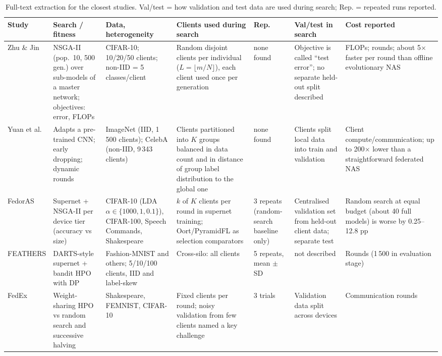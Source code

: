 \documentclass[11pt,a4paper]{article}
\begin{document}
\begin{landscape}
\begin{table}[p]\centering\scriptsize
\caption{Full-text extraction for the closest studies. Val/test = how validation and test data are used during search; Rep. = repeated runs reported.}\label{tab:fulltext}
\begin{tabular}{@{}p{2.5cm}p{4cm}p{3.6cm}p{4.4cm}p{1.9cm}p{3.1cm}p{3.1cm}@{}}\toprule
Study & Search / fitness & Data, heterogeneity & Clients used during search & Rep. & Val/test in search & Cost reported\\\midrule
Zhu \& Jin \cite{zhu2021realtime} & NSGA-II (pop.\ 10, 500 gen.) over sub-models of a master network; objectives: error, FLOPs & CIFAR-10; 10/20/50 clients; non-IID = 5 classes/client & Random disjoint clients per individual ($L=\lfloor m/N\rfloor$), each client used once per generation & none found & Objective is called ``test error''; no separate held-out split described & FLOPs; rounds; about 5$\times$ faster per round than offline evolutionary NAS\\
Yuan et al.\ \cite{yuan2022resourceaware} & Adapts a pre-trained CNN; early dropping; dynamic rounds & ImageNet (IID, 1\,500 clients); CelebA (non-IID, 9\,343 clients) & Clients partitioned into $K$ groups balanced in data count and in distance of group label distribution to the global one & none found & Clients split local data into train and validation & Client compute/communication; up to 200$\times$ lower than a straightforward federated NAS\\
FedorAS \cite{dudziak2022fedoras} & Supernet + NSGA-II per device tier (accuracy vs size) & CIFAR-10 (LDA $\alpha\in\{1000,1,0.1\}$), CIFAR-100, Speech Commands, Shakespeare & $k$ of $K$ clients per round in supernet training; Oort/PyramidFL as selection comparators & 3 repeats (random-search baseline only) & Centralised validation set from held-out client data; separate test & Random search at equal budget (about 40 full models) is worse by 0.25--12.8 pp\\
FEATHERS \cite{seng2022feathers} & DARTS-style supernet + bandit HPO with DP & Fashion-MNIST and others; 5/10/100 clients, IID and label-skew & Cross-silo: all clients & 5 repeats, mean $\pm$ SD & not described & Rounds (1\,500 in evaluation stage)\\
FedEx \cite{khodak2021federated} & Weight-sharing HPO vs random search and successive halving & Shakespeare, FEMNIST, CIFAR-10 & Fixed clients per round; noisy validation from few clients named a key challenge & 3 trials & Validation data split across devices & Communication rounds\\

\end{tabular}
\end{table}
\end{landscape}
\end{document}
